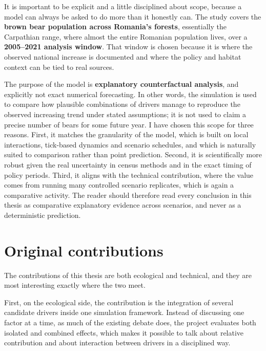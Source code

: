 It is important to be explicit and a little disciplined about scope, because a model can always be asked to do more than it honestly can. The study covers the \textbf{brown bear population across Romania's forests}, essentially the Carpathian range, where almost the entire Romanian population lives, over a \textbf{2005--2021 analysis window}. That window is chosen because it is where the observed national increase is documented and where the policy and habitat context can be tied to real sources.

The purpose of the model is \textbf{explanatory counterfactual analysis}, and explicitly not exact numerical forecasting. In other words, the simulation is used to compare how plausible combinations of drivers manage to reproduce the observed increasing trend under stated assumptions; it is not used to claim a precise number of bears for some future year. I have chosen this scope for three reasons. First, it matches the granularity of the model, which is built on local interactions, tick-based dynamics and scenario schedules, and which is naturally suited to comparison rather than point prediction. Second, it is scientifically more robust given the real uncertainty in census methods and in the exact timing of policy periods. Third, it aligns with the technical contribution, where the value comes from running many controlled scenario replicates, which is again a comparative activity. The reader should therefore read every conclusion in this thesis as comparative explanatory evidence across scenarios, and never as a deterministic prediction.

\section{Original contributions}

The contributions of this thesis are both ecological and technical, and they are most interesting exactly where the two meet.

First, on the ecological side, the contribution is the integration of several candidate drivers inside one simulation framework. Instead of discussing one factor at a time, as much of the existing debate does, the project evaluates both isolated and combined effects, which makes it possible to talk about relative contribution and about interaction between drivers in a disciplined way.

